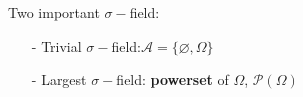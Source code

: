 \documentclass[10pt,landscape,a4paper]{article}
\begin{document}
\begin{multicols*}{5}
Two important $\sigma-$field:
\begin{itemize}
    \item[-] Trivial $\sigma-$field:$\mathcal{A}=\{\varnothing,\Omega\}$
    \item[-] Largest $\sigma-$field: \textbf{powerset} of $\Omega$, $\mathcal{P}(\Omega)$
\end{itemize}

\end{multicols*}
\end{document}
